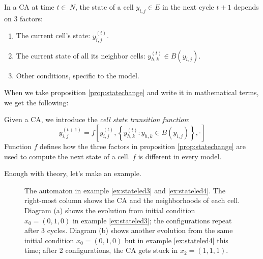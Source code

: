 \begin{proposition}
\label{prop:statechange}
In a CA at time $t \in \mathbb~{N}$,
the state of a cell $y_{i,j} \in E$ in the next cycle $t+1$ depends on 3 factors:
\begin{enumerate}
\item The current cell's state: $y^{(t)}_{i,j}$.
\item The current state of all its neighbor cells: $y^{(t)}_{h,k} \in B\left( y_{i,j} \right)$.
\item Other conditions, specific to the model.
\end{enumerate}
\end{proposition}

When we take proposition \ref{prop:statechange} and write it in mathematical terms, we
get the following:

\begin{definition}
\label{def:statetransf}
Given a CA, we introduce the \textit{cell state transition function}:
\begin{equation}
y^{(t+1)}_{i,j} = f \left[ y^{(t)}_{i,j}, 
    \left\{ y^{(t)}_{h,k} : y_{h,k} \in B\left( y_{i,j} \right) \right\}, \cdot \right]
\end{equation}
Function $f$ defines how the three factors in proposition \ref{prop:statechange}
are used to compute the next state of a cell. $f$ is different in every model.
\end{definition}

Enough with theory, let's make an example.

%
\begin{figure}[b]
\sidecaption

%
%
\caption{The automaton in example \ref{ex:stateled3} and \ref{ex:stateled4}.
The right-most column shows the CA and the neighborhoods of each cell.
Diagram (a) shows the evolution from initial condition $x_0 = (0,1,0)$ in example
\ref{ex:stateled3}; the configurations repeat after 3 cycles.
Diagram (b) shows another evolution from the same initial condition $x_0 = (0,1,0)$ but in example
\ref{ex:stateled4} this time;
after 2 configurations, the CA gets stuck in $x_2 = (1,1,1)$.}
\label{fig:threecell}
\end{figure}
%

